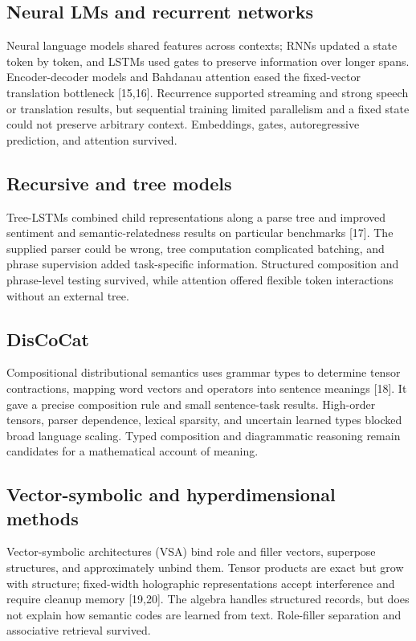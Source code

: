 \subsection{Neural LMs and recurrent networks}
Neural language models shared features across contexts; RNNs updated a state token by token, and LSTMs used gates to preserve information over longer spans. Encoder-decoder models and Bahdanau attention eased the fixed-vector translation bottleneck [15,16]. Recurrence supported streaming and strong speech or translation results, but sequential training limited parallelism and a fixed state could not preserve arbitrary context. Embeddings, gates, autoregressive prediction, and attention survived.

\subsection{Recursive and tree models}
Tree-LSTMs combined child representations along a parse tree and improved sentiment and semantic-relatedness results on particular benchmarks [17]. The supplied parser could be wrong, tree computation complicated batching, and phrase supervision added task-specific information. Structured composition and phrase-level testing survived, while attention offered flexible token interactions without an external tree.

\subsection{DisCoCat}
Compositional distributional semantics uses grammar types to determine tensor contractions, mapping word vectors and operators into sentence meanings [18]. It gave a precise composition rule and small sentence-task results. High-order tensors, parser dependence, lexical sparsity, and uncertain learned types blocked broad language scaling. Typed composition and diagrammatic reasoning remain candidates for a mathematical account of meaning.

\subsection{Vector-symbolic and hyperdimensional methods}
Vector-symbolic architectures (VSA) bind role and filler vectors, superpose structures, and approximately unbind them. Tensor products are exact but grow with structure; fixed-width holographic representations accept interference and require cleanup memory [19,20]. The algebra handles structured records, but does not explain how semantic codes are learned from text. Role-filler separation and associative retrieval survived.


